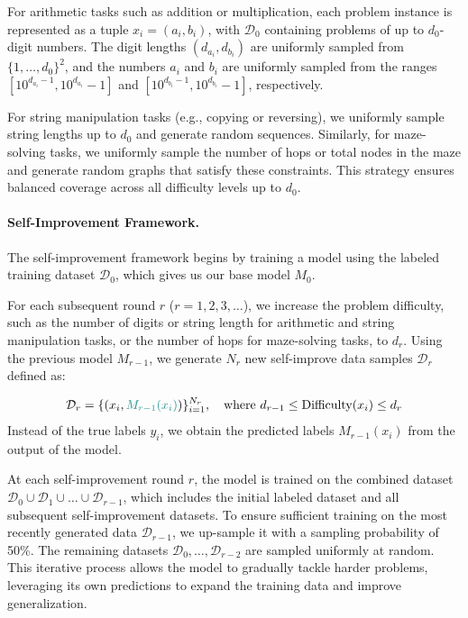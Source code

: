 For arithmetic tasks such as addition or multiplication, each problem instance is represented as a tuple $x_i = (a_i, b_i)$, with $\mathcal{D}_0$ containing problems of up to $d_0$-digit numbers. The digit lengths $(d_{a_i}, d_{b_i})$ are uniformly sampled from $\{1, \dots, d_0\}^2$, and the numbers $a_i$ and $b_i$ are uniformly sampled from the ranges $[10^{d_{a_i}-1}, 10^{d_{a_i}}-1]$ and $[10^{d_{b_i}-1}, 10^{d_{b_i}}-1]$, respectively.

For string manipulation tasks (e.g., copying or reversing), we uniformly sample string lengths up to $d_0$ and generate random sequences. Similarly, for maze-solving tasks, we uniformly sample the number of hops or total nodes in the maze and generate random graphs that satisfy these constraints. %
This strategy ensures balanced coverage across all difficulty levels up to $d_0$. %








\paragraph{Self-Improvement Framework. }

The self-improvement framework begins by training a model using the labeled training dataset $\mathcal{D}_0$, which gives us our base model $M_0$. %

For each subsequent round $r$ ($r = 1, 2, 3, \dots$), we increase the problem difficulty, such as the number of digits or string length for arithmetic and string manipulation tasks, or the number of hops for maze-solving tasks, to $d_r$. Using the previous model $M_{r-1}$, we generate $N_r$ new self-improve data samples $\mathcal{D}_r$ defined as:

\begin{align*}
    \mathcal{D}_r = \{(x_i, {\color{blue}M_{r-1}(x_i)})\}_{i=1}^{N_r},\quad \text{where }d_{r-1}\leq \text{Difficulty}(x_i)\leq d_r
\end{align*}
Instead of the true labels $y_i$, we obtain the predicted labels $M_{r-1}(x_i)$ from the output of the model.

At each self-improvement round \( r \), the model is trained on the combined dataset \( \mathcal{D}_0 \cup \mathcal{D}_1 \cup \dots \cup \mathcal{D}_{r-1} \), which includes the initial labeled dataset and all subsequent self-improvement datasets. To ensure sufficient training on the most recently generated data \( \mathcal{D}_{r-1} \), we up-sample it with a sampling probability of 50\%. The remaining datasets \( \mathcal{D}_0, \dots, \mathcal{D}_{r-2} \) are sampled uniformly at random. %
This iterative process allows the model to gradually tackle harder problems, leveraging its own predictions to expand the training data and improve generalization. 

